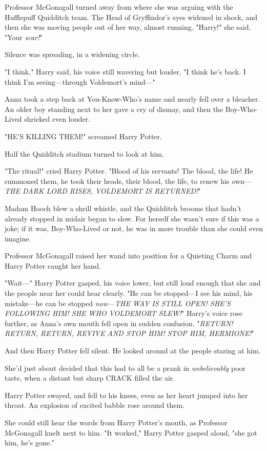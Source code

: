 Professor McGonagall turned away from where she was arguing with the Hufflepuff
Quidditch team. The Head of Gryffindor's eyes widened in shock, and then she
was moving people out of her way, almost running. "Harry!" she said. "Your
\emph{scar!}"

Silence was spreading, in a widening circle.

"I think," Harry said, his voice still wavering but louder, "I think he's back.
I think I'm seeing---through Voldemort's mind---"

Anna took a step back at You-Know-Who's name and nearly fell over a bleacher.
An older boy standing next to her gave a cry of dismay, and then the
Boy-Who-Lived shrieked even louder.

"HE'S KILLING THEM!" screamed Harry Potter.

Half the Quidditch stadium turned to look at him.

"The ritual!" cried Harry Potter. "Blood of his servants! The blood, the life!
He summoned them, he took their heads, their blood, the life, to renew his
own---\emph{THE DARK LORD RISES, VOLDEMORT IS RETURNED!}"

Madam Hooch blew a shrill whistle, and the Quidditch brooms that hadn't already
stopped in midair began to slow. For herself she wasn't sure if this was a
joke; if it was, Boy-Who-Lived or not, he was in more trouble than she could
even imagine.

Professor McGonagall raised her wand into position for a Quieting Charm and
Harry Potter caught her hand.

"Wait---" Harry Potter gasped, his voice lower, but still loud enough that she
and the people near her could hear clearly. "He can be stopped---I see his
mind, his mistake---he can be stopped \emph{now}---\emph{THE WAY IS STILL OPEN!
SHE'S FOLLOWING HIM! SHE WHO VOLDEMORT SLEW!}" Harry's voice rose further, as
Anna's own mouth fell open in sudden confusion. "\emph{RETURN! RETURN, RETURN,
REVIVE AND STOP HIM! STOP HIM, HERMIONE!}"

And then Harry Potter fell silent. He looked around at the people staring at
him.

She'd just about decided that this had to all be a prank in \emph{unbelievably}
poor taste, when a distant but sharp CRACK filled the air.

Harry Potter swayed, and fell to his knees, even as her heart jumped into her
throat. An explosion of excited babble rose around them.

She could still hear the words from Harry Potter's mouth, as Professor
McGonagall knelt next to him. "It worked," Harry Potter gasped aloud, "she got
him, he's gone."

